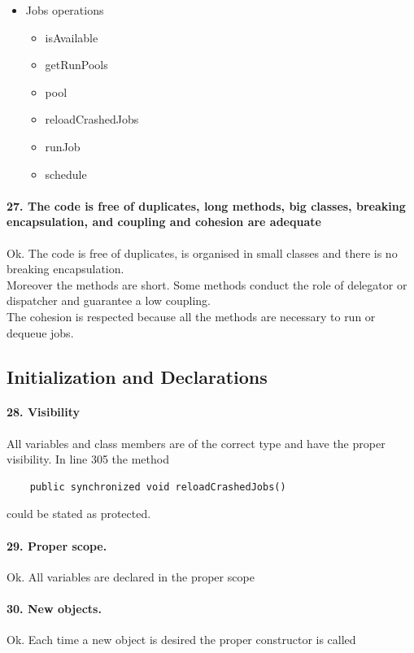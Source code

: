 \documentclass[english]{article}
\begin{document}
{{\begin{itemize}
	\item Jobs operations
	\begin{itemize}
		\item{isAvailable}
		\item{getRunPools}
		\item{pool}
		\item{reloadCrashedJobs}
		\item{runJob}
		\item{schedule}
	\end{itemize}
\end{itemize}

\paragraph{27. The code is free of duplicates, long methods, big classes, breaking encapsulation, and coupling and cohesion are adequate}
Ok.
The code is free of duplicates, is organised in small classes and there is no breaking encapsulation.\\
Moreover the methods are short. Some methods conduct the role of delegator or dispatcher and guarantee a low coupling.\\
The cohesion is respected because all the methods are necessary to run or dequeue jobs.

\subsection{Initialization and Declarations}

\paragraph{28. Visibility}
All variables and class members are of the correct type and have the proper visibility.
In line 305 the method 
\begin{lstlisting} 
	public synchronized void reloadCrashedJobs()
\end{lstlisting} 
could be stated as protected.

\paragraph{29. Proper scope.} 
Ok. All variables are declared in the proper scope

\paragraph{30. New objects.} 
Ok. Each time a new object is desired the proper constructor is called

}}
\end{document}
